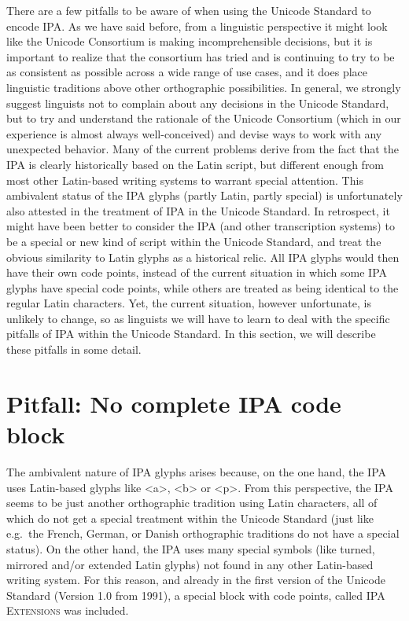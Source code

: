 There are a few pitfalls to be aware of when using the Unicode Standard
to encode IPA. As we have said before, from a linguistic perspective it might
look like the Unicode Consortium is making incomprehensible decisions, but it is
important to realize that the consortium has tried and is continuing to try to
be as consistent as possible across a wide range of use cases, and it does place
linguistic traditions above other orthographic possibilities. In general, we
strongly suggest linguists not to complain about any decisions in the Unicode
Standard, but to try and understand the rationale of the Unicode Consortium
(which in our experience is almost always well-conceived) and devise ways to
work with any unexpected behavior. Many of the current problems derive from the
fact that the IPA is clearly historically based on the Latin script, but
different enough from most other Latin-based writing systems to warrant special
attention. This ambivalent status of the IPA glyphs (partly Latin, partly
special) is unfortunately also attested in the treatment of IPA in the Unicode
Standard. In retrospect, it might have been better to consider the IPA (and
other transcription systems) to be a special or new kind of script within the
Unicode Standard, and treat the obvious similarity to Latin glyphs as a
historical relic. All IPA glyphs would then have their own code points, instead
of the current situation in which some IPA glyphs have special code points,
while others are treated as being identical to the regular Latin characters.
Yet, the current situation, however unfortunate, is unlikely to change, so as
linguists we will have to learn to deal with the specific pitfalls of IPA within
the Unicode Standard. In this section, we will describe these pitfalls in some
detail.

\section{Pitfall: No complete IPA code block}
\label{pitfall-no-complete-ipa-block}

The ambivalent nature of IPA glyphs arises because, on the one hand, the IPA
uses Latin-based glyphs like <a>, <b> or <p>. From this perspective, the IPA
seems to be just another orthographic tradition using Latin characters, all of
which do not get a special treatment within the Unicode Standard (just like
e.g.~the French, German, or Danish orthographic traditions do not have a special
status). On the other hand, the IPA uses many special symbols (like turned,
mirrored and/or extended Latin glyphs) not found in any other Latin-based
writing system. For this reason, and already in the first version of the Unicode
Standard (Version 1.0 from 1991), a special block with code points, called
\textsc{IPA Extensions} was included. 

